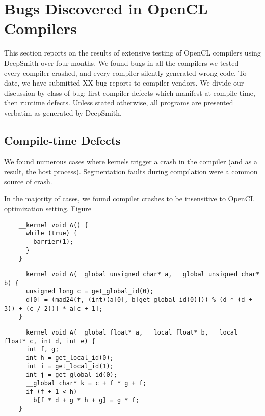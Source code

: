 \section{Bugs Discovered in OpenCL Compilers}

This section reports on the results of extensive testing of OpenCL compilers using DeepSmith over four months. We found bugs in all the compilers we tested --- every compiler crashed, and every compiler silently generated wrong code. To date, we have submitted XX bug reports to compiler vendors. We divide our discussion by class of bug: first compiler defects which manifest at compile time, then runtime defects. Unless stated otherwise, all programs are presented verbatim as generated by DeepSmith.


\subsection{Compile-time Defects}

We found numerous cases where kernels trigger a crash in the compiler (and as a result, the host process). Segmentation faults during compilation were a common source of crash.

In the majority of cases, we found compiler crashes to be insensitive to OpenCL optimization setting. Figure~

\newsavebox{\IntelVectorizerSegfault}
\begin{lrbox}{\IntelVectorizerSegfault}
  \hspace{1.5em}
  \begin{lstlisting}
    __kernel void A() {
      while (true) {
        barrier(1);
      }
    }
  \end{lstlisting}
\end{lrbox}

\newsavebox{\OclgrindSemaAssertion}
\begin{lrbox}{\OclgrindSemaAssertion}
  \hspace{1.5em}
  \begin{lstlisting}
    __kernel void A(__global unsigned char* a, __global unsigned char* b) {
      unsigned long c = get_global_id(0);
      d[0] = (mad24(f, (int)(a[0], b[get_global_id(0)])) % (d * (d + 3)) + (c / 2))] * a[c + 1];
    }
  \end{lstlisting}
\end{lrbox}

\newsavebox{\NvidiaCompileSegfault}
\begin{lrbox}{\NvidiaCompileSegfault}
  \hspace{1.5em}
  \begin{lstlisting}
    __kernel void A(__global float* a, __local float* b, __local float* c, int d, int e) {
      int f, g;
      int h = get_local_id(0);
      int i = get_local_id(1);
      int j = get_global_id(0);
      __global char* k = c + f * g + f;
      if (f + 1 < h)
        b[f * d + g * h + g] = g * f;
    }
  \end{lstlisting}
\end{lrbox}

